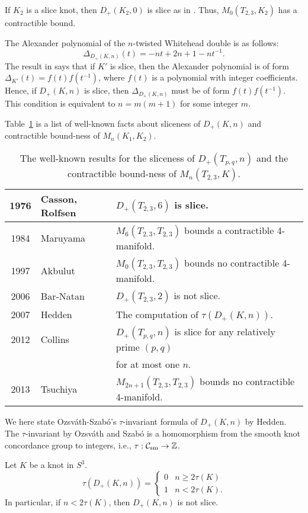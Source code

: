 \documentclass[11pt]{amsart}
\begin{document}
If $K_2$ is a slice knot, then $D_+(K_2,0)$ is slice as in \cite{Kau}.
Thus, $M_0(T_{2,3},K_2)$ has a contractible bound.

The Alexander polynomial of the $n$-twisted Whitehead double is as follows:
$$\Delta_{D_+(K,n)}(t)=-nt+2n+1-nt^{-1}.$$
The result in \cite{FM} says that
if $K'$ is slice, then the Alexander polynomial is of form $\Delta_{K'}(t)=f(t)f(t^{-1})$, where $f(t)$ is a polynomial with integer coefficients.
Hence, if $D_+(K,n)$ is slice, then $\Delta_{D_+(K,n)}$ must be of form $f(t)f(t^{-1})$.
This condition is equivalent to $n=m(m+1)$ for some integer $m$.

Table~\ref{tableofslice} is a list of well-known facts about sliceness of $D_+(K,n)$ and 
contractible bound-ness of $M_n(K_1,K_2)$.
\begin{table}[htbp]
\begin{tabular}{|c|l|l|}\hline
1976&Casson, Rolfsen&$D_+(T_{2,3},6)$ is slice. \cite{R, Kau}\\\hline
1984&Maruyama&$M_6(T_{2,3},T_{2,3})$ bounds a contractible 4-manifold. \cite{M}\\\hline
1997&Akbulut&$M_0(T_{2,3},T_{2,3})$ bounds no contractible 4-manifold. \cite{A}\\\hline
2006&Bar-Natan&$D_+(T_{2,3},2)$ is not slice. \cite{Ba}\\\hline
2007&Hedden&The computation of $\tau(D_+(K,n))$. \cite{H}\\\hline
2012&Collins&$D_+(T_{p,q},n)$ is slice for any relatively prime $(p,q)$\\
&&for at most one $n$. \cite{JC}\\\hline
2013&Tsuchiya&$M_{2n+1}(T_{2,3},T_{2,3})$ bounds no contractible 4-manifold. \cite{T}\\\hline
\end{tabular}
\caption{The well-known results for the sliceness of $D_+(T_{p,q},n)$ and 
the contractible bound-ness of $M_n(T_{2,3},K)$.}
\label{tableofslice}
\end{table}
We here state Ozsv\'ath-Szab\'o's $\tau$-invariant formula of $D_+(K,n)$ by Hedden.
The $\tau$-invariant by Ozsv\'ath and Szab\'o is a homomorphism from the smooth knot concordance group to integers, i.e., $\tau:{\mathcal C}_{\text{sm}}\to {\Bbb Z}$.
\begin{thm}[\cite{H}]
\label{Hedd}
Let $K$ be a knot in $S^3$.
$$\tau(D_+(K,n))=\begin{cases}0&n\ge 2\tau(K)\\1&n<2\tau(K).\end{cases}$$
In particular, if $n<2\tau(K)$, then $D_+(K,n)$ is not slice.
\end{thm}
\end{document}
